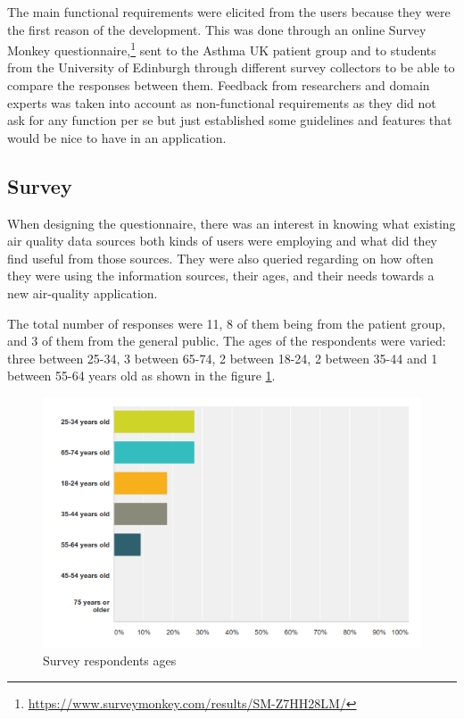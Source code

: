 The main functional requirements were elicited from the users because they were the first reason of the development. This was done through an online Survey Monkey questionnaire,\footnote{\url{https://www.surveymonkey.com/results/SM-Z7HH28LM/}} sent to the Asthma UK patient group and to students from the University of Edinburgh through different survey collectors to be able to compare the responses between them. Feedback from researchers and domain experts was taken into account as non-functional requirements as they did not ask for any function per se but just established some guidelines and features that would be nice to have in an application.

\subsection{Survey}

When designing the questionnaire, there was an interest in knowing what existing air quality data sources both kinds of users were employing and what did they find useful from those sources. They were also queried regarding on how often they were using the information sources, their ages, and their needs towards a new air-quality application.

The total number of responses were 11, 8 of them being from the patient group, and 3 of them from the general public. The ages of the respondents were varied: three between 25-34, 3 between 65-74, 2 between 18-24, 2 between 35-44 and 1 between 55-64 years old as shown in the figure \ref{fig:survey_ages}. 

\begin{figure}[H]
\begin{adjustbox}{width=1\textwidth,center=\textwidth}
  \centering
  \includegraphics[scale=1]{images/ages_survey.png}
\end{adjustbox}
  \caption[Survey respondents ages ]{Survey respondents ages}
  \label{fig:survey_ages}
\end{figure}

